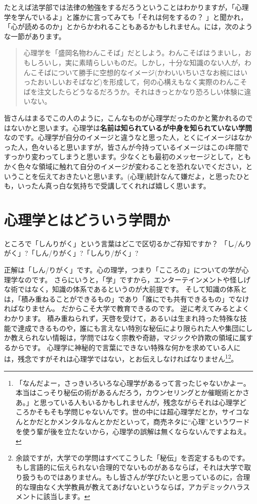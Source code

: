 \documentclass{ltjsbook}
\begin{document}
たとえば法学部では法律の勉強をするだろうということはわかりますが，「心理学を学んでいるよ」と誰かに言ってみても「それは何をするの？ 」と聞かれ，「心が読めるのか」とからかわれることもあるかもしれません。\textcite{Michimata200903}には，次のような一節があります。

\begin{quote}
	心理学を「盛岡名物わんこそば」だとしよう。わんこそばはうまいし，おもしろいし，実に素晴らしいものだ。しかし，十分な知識のない人が，わんこそばについて勝手に空想的なイメージ(かわいいちいさなお椀にはいったおいしいおそばなど)を形成して，何の心構えもなく実際のわんこそばを注文したらどうなるだろうか。それはきっとかなり恐ろしい体験に違いない。
\end{quote}

皆さんはまるでこの人のように，こんなものが心理学だったのかと驚かれるのではないかと思います。心理学は\textbf{名前は知られているが中身を知られていない学問}なのです。心理学が自分のイメージと違うなと思った人，とくにイメージはなかった人，色々いると思いますが，皆さんが今持っているイメージはこの4年間ですっかり変わってしまうと思います。少なくとも最初のメッセージとして，ともかく色々な領域に触れて自分のイメージが変わることを恐れないでください，ということを伝えておきたいと思います。(心理)統計なんて嫌だよ，と思ったひとも，いったん真っ白な気持ちで受講してくれれば嬉しく思います。

\section{心理学とはどういう学問か}

ところで「しんりがく」という言葉はどこで区切るかご存知ですか？ 「し/んりがく」?「しん/りがく」?「しんり/がく」?

正解は「しん/りがく」です。心の理学，つまり「こころの」についての学が心理学なのです。
さらにいうと，「学」ですから，エンターテインメントや怪しげな術ではなく，知識の体系であるというのが大前提です。
そして知識の体系とは，「積み重ねることができるもの」であり「誰にでも共有できるもの」でなければなりません。
だからこそ大学で教育できるのです。
逆に考えてみるとよくわかります。
積み重ねられず，天啓を受けて，あるいは生まれ持った特殊な技能で達成できるものや，誰にも言えない特別な秘伝により限られた人や集団にしか教えられない情報は，学問ではなく宗教や奇跡，マジックや詐欺の領域に属するからです。
心理学に神秘的で言葉にできない特殊な何かを求めている人には，残念ですがそれは心理学ではない，とお伝えしなければなりません\footnote{「なんだよー，さっきいろいろな心理学があるって言ったじゃないかよー。本当はこっそり秘伝の術があるんだろう，カウンセリングとか催眠術とかさあ。」と思っている人もいるかもしれませんが，残念ながらそれは心理学どころかそもそも学問じゃないんです。世の中には超心理学だとか，サイコなんとかだとかメンタルなんとかだといって，商売ネタに``心理''というワードを使う輩が後を立たないから，心理学の誤解は無くならないんですよねえ。}\footnote{余談ですが，大学での学問はすべてこうした「秘伝」を否定するものです。もし言語的に伝えられない合理的でないものがあるならば，それは大学で取り扱うものではありません。もし皆さんが学びたいと思っているのに，合理的な理由なく大学教員が教えてあげないというならば，アカデミックハラスメントに該当します。}。
\end{document}
